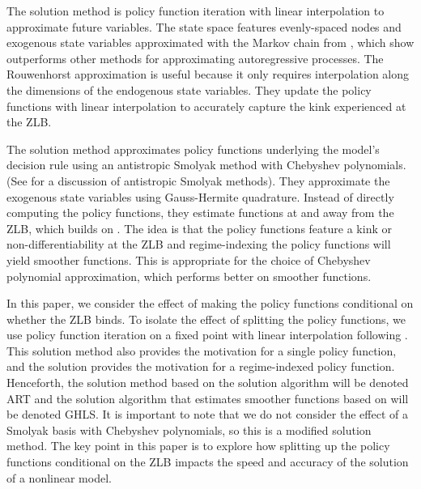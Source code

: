 \documentclass[12pt, final]{article}
\begin{document}
The \hyperlink{Atkinson}{\color{black}{Atkinson et al.\ (2019)}} solution method is policy function iteration with linear interpolation to approximate future variables.  The state space features evenly-spaced nodes and exogenous state variables  approximated with the Markov chain from \hyperlink{Rouwenhorst}{\color{black}{Rouwenhorst (1995)}}, which \hyperlink{Kopecky}{\color{black}{Kopecky and Suen (2010)}} show outperforms other methods for approximating autoregressive processes. The Rouwenhorst approximation is useful because it only requires interpolation along the dimensions of the endogenous state variables. They update the policy functions with linear interpolation to accurately capture the kink experienced at the ZLB.

The \hyperlink{Gust}{\color{black}{Gust et al.\ (2017)}} solution method approximates policy functions underlying the model's decision rule using an antistropic Smolyak method with Chebyshev polynomials. (See \hyperlink{Judd2}{\color{black}{Judd et al.\, 2014}} for a discussion of antistropic Smolyak methods). They approximate the exogenous state variables using Gauss-Hermite quadrature. Instead of directly computing the policy functions, they estimate functions at and away from the ZLB, which builds on \hyperlink{Christiano}{\color{black}{Christiano and Fisher (2000)}}. The idea is that the policy functions feature a kink or non-differentiability at the ZLB and regime-indexing the policy functions will yield smoother functions. This is appropriate for the choice of Chebyshev polynomial approximation, which performs better on smoother functions. 

In this paper, we consider the effect of making the policy functions conditional on whether the ZLB binds. To isolate the effect of splitting the policy functions, we use policy function iteration on a fixed point with linear interpolation following \hyperlink{Atkinson}{\color{black}{Atkinson et al.\ (2019)}}. This solution method also provides the motivation for a single policy function, and the \hyperlink{Gust}{\color{black}{Gust et al.\ (2017)}} solution provides the motivation for a regime-indexed policy function. Henceforth, the solution method based on the \hyperlink{Atkinson}{\color{black}{Atkinson et al.\ (2019)}} solution algorithm will be denoted ART and the solution algorithm that estimates smoother functions based on \hyperlink{Gust}{\color{black}{Gust et al.\ (2017)}} will be denoted GHLS. It is important to note that we do not consider the effect of a Smolyak basis with Chebyshev polynomials, so this is a modified \hyperlink{Gust}{\color{black}{Gust et al.\ (2017)}} solution method. The key point in this paper is to explore how splitting up the policy functions conditional on the ZLB impacts the speed and accuracy of the solution of a nonlinear model. 
\end{document}
